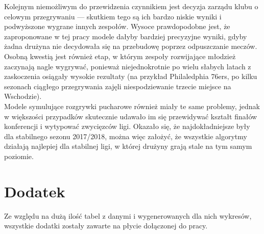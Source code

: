 \documentclass[inzynierska]{pwr_wmat_praca_dyplomowa}
\theoremstyle{plain}
\numberwithin{theorem}{chapter}
\theoremstyle{definition}
\numberwithin{theorem}{chapter}
\begin{document}
\hspace*{6mm}Kolejnym niemożliwym do przewidzenia czynnikiem jest decyzja zarządu klubu o celowym przegrywaniu --- skutkiem tego są ich bardzo niskie wyniki i podwyższone wygrane innych zespołów. Wysoce prawdopodobne jest, że zaproponowane w tej pracy modele dałyby bardziej precyzyjne wyniki, gdyby żadna drużyna nie decydowała się na przebudowę poprzez odpuszczanie meczów. Osobną kwestią jest również etap, w którym zespoły rozwijające młodzież zaczynają nagle wygrywać, ponieważ niejednokrotnie po wielu słabych latach z zaskoczenia osiągały wysokie rezultaty (na przykład Philaledphia 76ers, po kilku sezonach ciągłego przegrywania zajęli niespodziewanie trzecie miejsce na Wschodzie). \\
\hspace*{6mm}Modele symulujące rozgrywki pucharowe również miały te same problemy, jednak w większości przypadków skutecznie udawało im się przewidywać kształt finałów konferencji i wytypować zwycięzców ligi. Okazało się, że najdokładniejsze były dla stabilnego sezonu 2017/2018, można więc założyć, że wszystkie algorytmy działają najlepiej dla stabilnej ligi, w której drużyny grają stale na tym samym poziomie. 

{\backmatter \chapter{Dodatek}}
Ze względu na dużą ilość tabel z danymi i wygenerowanych dla nich wykresów, wszystkie dodatki zostały zawarte na płycie dołączonej do pracy.

\newpage
\end{document}
